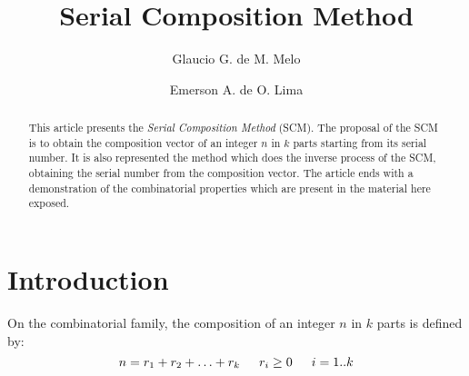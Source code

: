 \documentclass{amsart}
\newcommand{\emerson}{Emerson A. de O. Lima}
\newcommand{\glaucio}{Glaucio G. de M. Melo}
\begin{document}
\title[Serial Composition Method]
 {Serial Composition Method}


\author[Melo]{\glaucio}

\address[Melo]{Departamento de Estat\'{\i}stica e Inform\'{a}tica - UNICAP}


\author[Oliveira Lima]{\emerson}

\address[Oliveira Lima]{Departamento de Estat\'{\i}stica e Inform\'{a}tica - UNICAP}





\begin{abstract}

This article presents the \emph{Serial Composition Method} (SCM). The proposal of the SCM is to obtain the composition vector of an integer {$n$} in {$k$} parts starting from its serial number. It is also represented the method which does the inverse process of the SCM, obtaining the serial number from the composition vector. The article ends with a demonstration of the combinatorial properties which are present in the material here exposed.

\end{abstract}


\maketitle

\section*{Introduction}
On the combinatorial family, the composition of an integer {$n$} in {$k$} parts is defined by:
\begin{equation}
n = r_1 + r_2 + \ldots + r_k \indent r_i \geq 0 \indent i=1..k
\end{equation}
\end{document}
